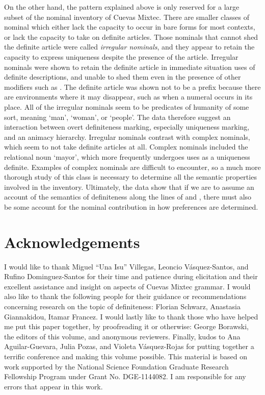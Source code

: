 \documentclass[output=paper,modfonts,nonflat]{langsci/langscibook}
\begin{document}
On the other hand, the pattern explained above is only reserved for a large subset of the nominal inventory of Cuevas Mixtec.  There are smaller classes of nominal which either lack the capacity to occur in bare forms for most contexts, or lack the capacity to take on definite articles.  Those nominals that cannot shed the definite article were called \textit{irregular nominals}, and they appear to retain the capacity to express uniqueness despite the presence of the article.  Irregular nominals were shown to retain the definite article in immediate situation uses of definite descriptions, and unable to shed them even in the presence of other modifiers such as .  The definite article was shown not to be a prefix because there are environments where it may disappear, such as when a numeral occurs in its place.  All of the irregular nominals seem to be predicates of humanity of some sort, meaning `man', `woman', or `people'.  The data therefore suggest an interaction between overt definiteness marking, especially uniqueness marking, and an animacy hierarchy.  Irregular nominals contrast with complex nominals, which seem to not take definite articles at all.  Complex nominals included the relational noun `mayor', which more frequently undergoes uses as a uniqueness definite.  Examples of complex nominals are difficult to encounter, so a much more thorough study of this class is necessary to determine all the semantic properties involved in the inventory.  Ultimately, the data show that if we are to assume an account of the semantics of definiteness along the lines of \citeauthor{Schwarz2009} and \citeauthor{Jenks2015}, there must also be some account for the nominal contribution in how  preferences are determined.\newpage

\section*{Acknowledgements}

I would like to thank Miguel ``Una Isu'' Villegas, Leoncio V\'asquez-Santos, and Rufino Dominguez-Santos for their time and patience during elicitation and their excellent assistance and insight on aspects of Cuevas Mixtec grammar.  I would also like to thank the following people for their guidance or recommendations concerning research on the topic of definiteness: Florian Schwarz, Anastasia Giannakidou, Itamar Francez.  I would lastly like to thank those who have helped me put this paper together, by proofreading it or otherwise: George Borawski, the editors of this volume, and anonymous reviewers.  Finally, kudos to Ana Aguilar-Guevara, Julia Pozas, and Violeta V\'asquez-Rojas for putting together a terrific conference and making this volume possible.  This material is based on work supported by the National Science Foundation Graduate Research Fellowship Program under Grant No. DGE-1144082.  I am responsible for any errors that appear in this work.
\end{document}

